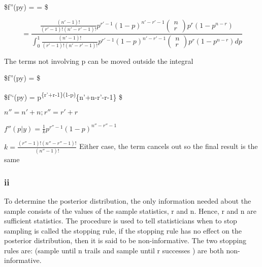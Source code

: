 \documentclass[]{article}
\begin{document}
\$f''(p\textbar{}y) =  =
 \$

\[= \frac{\frac{(n'-1)!}{(r'-1)!(n'-r'-1)!}p^{r'-1}(1-p)^{n'-r'-1}\left(\begin{array}{cc} 
n \\
r 
\end{array}\right)p^r(1-p^{n-r})}
{\int_{0}^{1}\frac{(n'-1)!}{(r'-1)!(n'-r'-1)!}p^{r'-1}(1-p)^{n'-r'-1}\left(\begin{array}{cc} 
n \\
r 
\end{array}\right)p^r(1-p^{n-r})dp}\]

The terms not involving p can be moved outside the integral

\$f''(p\textbar{}y) =
\$

\$f'`(p\textbar{}y) =
p\textsuperscript{\{r'+r-1\}(1-p)}\{n'+n-r'-r-1\} \$

\(n''=n'+n ; r''=r'+r\)

\(f''(p|y) = \frac{1}{k}p^{r''-1}(1-p)^{n''-r''-1}\)

\(k = \frac{(r''-1)!(n''-r''-1)!}{(n''-1)!}\) Either case, the term
cancels out so the final result is the same

\subsubsection{ii}\label{ii-1}

To determine the posterior distribution, the only information needed
about the sample consists of the values of the sample statistics, r and
n. Hence, r and n are sufficient statistics. The procedure is used to
tell statisticians when to stop sampling is called the stopping rule, if
the stopping rule has no effect on the posterior distribution, then it
is said to be non-informative. The two stopping rules are: (sample until
n trails and sample until r successes ) are both non-informative.
\end{document}
